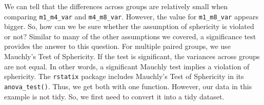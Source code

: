 \documentclass[
]{book}
\begin{document}
We can tell that the differences across groups are relatively small when comparing \texttt{m1\_m4\_var} and \texttt{m4\_m8\_var}. However, the value for \texttt{m1\_m8\_var} appears bigger. So, how can we be sure whether the assumption of sphericity is violated or not? Similar to many of the other assumptions we covered, a significance test provides the answer to this question. For multiple paired groups, we use Mauchly's Test of Sphericity. If the test is significant, the variances across groups are not equal. In other words, a significant Mauchly test implies a violation of sphericity. The \texttt{rstatix} package includes Mauchly's Test of Sphericity in its \texttt{anova\_test()}. Thus, we get both with one function. However, our data in this example is not tidy. So, we first need to convert it into a tidy dataset.
\end{document}
